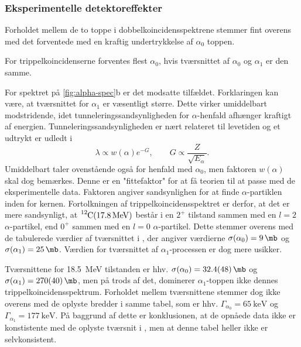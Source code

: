 \subsubsection{Eksperimentelle detektoreffekter}
\label{sec:data-detek}

Forholdet mellem de to toppe i dobbelkoincidensspektrene stemmer fint overens med det forventede med
en kraftig undertrykkelse af $\alpha_{0}$ toppen.

For trippelkoincidenserne forventes flest $\alpha_{0}$, hvis tværsnittet af $\alpha_{0}$ og
$\alpha_{1}$ er den samme.

For spektret på \cref{fig:alpha-spec}b er det modsatte tilfældet. Forklaringen kan være, at
tværsnittet for $\alpha_{1}$ er væsentligt større. Dette virker umiddelbart modstridende, idet
tunneleringssandsynligheden for $\alpha$-henfald afhænger kraftigt af
energien. Tunneleringssandsynligheden er nært relateret til levetiden og et udtrykt er udledt i
\cite[s. 236]{Martin}
\begin{equation}
  \label{eq:SStunnel}
  \lambda \propto w(\alpha) e^{-G}, \qquad G \propto \frac{Z}{\sqrt{E_{\alpha}}}.
\end{equation}
Umiddelbart taler ovenstående også for henfald med $\alpha_{0}$, men faktoren $w(\alpha)$ skal dog
bemærkes. Denne er en "fittefaktor"{} for at få teorien til at passe med de eksperimentelle
data. Faktoren angiver sandsynlighen for at finde $\alpha$-partiklen inden for kernen. Fortolkningen af
trippelkoincidensspektret er derfor, at det er mere sandsynligt, at $\Carb(\SI{17.8}{\MeV})$ består
\Be i en $2^{+}$ tilstand sammen med en $l=2$ $\alpha$-partikel, end $0^{+}$ \Be sammen med
en $l=0$ $\alpha$-partikel. Dette stemmer overens med de tabulerede værdier af tværsnittet i
\cite{States}, der angiver værdierne $\sigma(\alpha_{0}) = \SI{9}{\mb}$ og
$\sigma(\alpha_{1}) = \SI{25}{\mb}$. Værdien for tværsnittet af $\alpha_{1}$-processen er dog mere usikker.

Tværsnittene for \SI{18.5}{\MeV} tilstanden er hhv.  $\sigma(\alpha_{0}) = \SI{32.4\pm4.8}{\mb}$ og
$\sigma(\alpha_{1}) = \SI{270\pm40}{\mb}$, men på trods af det, dominerer $\alpha_{1}$-toppen ikke dennes
trippelkoincidensspektrum. Forholdet mellem tværsnittene stemmer dog ikke overens med de oplyste
bredder i samme tabel, som er hhv.  $\Gamma_{\alpha_{0}} = \SI{65}{\keV}$ og
$\Gamma_{\alpha_{1}} = \SI{177}{\keV}$. På baggrund af dette er konklusionen, at de opnåede data ikke er
konstistente med de oplyste tværsnit i \cite{States}, men at denne tabel heller ikke er
selvkonsistent.

